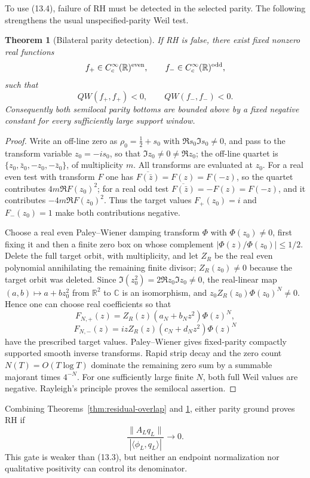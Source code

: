 \documentclass[11pt]{amsart}
\newtheorem{theorem}{Theorem}[section]
\theoremstyle{definition}
\theoremstyle{remark}
\newcommand{\R}{\mathbb R}
\begin{document}
To use (13.4), failure of RH must be detected in the selected parity.  The
following strengthens the usual unspecified-parity Weil test.

\begin{theorem}[Bilateral parity detection]
\label{thm:bilateral}
If RH is false, there exist fixed nonzero real functions
\[
 f_+\in C_c^\infty(\R)^{\rm even},
 \qquad f_-\in C_c^\infty(\R)^{\rm odd},
\]
such that
\[
 QW(f_+,f_+)<0,
 \qquad QW(f_-,f_-)<0.
 \tag{13.5}
\]
Consequently both semilocal parity bottoms are bounded above by a fixed
negative constant for every sufficiently large support window.
\end{theorem}

\begin{proof}
Write an off-line zero as \(\rho_0=\tfrac12+s_0\) with
\(\Re s_0\Im s_0\ne0\), and pass to the transform variable
\(z_0=-is_0\), so that \(\Im z_0\ne0\ne\Re z_0\); the off-line quartet is
\(\{z_0,\bar z_0,-z_0,-\bar z_0\}\), of multiplicity \(m\).  All transforms
are evaluated at \(z_0\).  For a real even test with transform \(F\) one has
\(\overline{F(\bar z)}=F(z)=F(-z)\), so the quartet contributes
\(4m\Re F(z_0)^2\); for a real odd test \(\overline{F(\bar z)}=-F(z)=F(-z)\),
and it contributes \(-4m\Re F(z_0)^2\).  Thus the target values
\(F_+(z_0)=i\) and \(F_-(z_0)=1\) make both contributions negative.

Choose a real even Paley--Wiener damping transform \(\Phi\) with
\(\Phi(z_0)\ne0\), first fixing it and then a finite zero box on whose
complement \(|\Phi(z)/\Phi(z_0)|\le1/2\).  Delete the full target orbit, with
multiplicity, and let \(Z_R\) be the real even polynomial annihilating the
remaining finite divisor; \(Z_R(z_0)\ne0\) because the target orbit was
deleted.  Since \(\Im(z_0^2)=2\Re z_0\Im z_0\ne0\), the real-linear map
\((a,b)\mapsto a+bz_0^2\) from \(\R^2\) to \(\mathbb C\) is an
isomorphism, and \(z_0Z_R(z_0)\Phi(z_0)^N\ne0\).  Hence one can choose real
coefficients so that
\[
 F_{N,+}(z)=Z_R(z)(a_N+b_Nz^2)\Phi(z)^N,
\]
\[
 F_{N,-}(z)=izZ_R(z)(c_N+d_Nz^2)\Phi(z)^N
\]
have the prescribed target values.  Paley--Wiener gives fixed-parity
compactly supported smooth inverse transforms.  Rapid strip decay and
the zero count \(N(T)=O(T\log T)\) dominate the remaining zero sum by a
summable majorant times \(4^{-N}\).  For one sufficiently large finite
\(N\), both full Weil values are negative.  Rayleigh's principle proves
the semilocal assertion.
\end{proof}

Combining Theorems~\ref{thm:residual-overlap} and
\ref{thm:bilateral}, either parity ground proves RH if
\[
 \boxed{
 \frac{\|A_Lq_L\|}{|\langle\phi_L,q_L\rangle|}\longrightarrow0.}
 \tag{13.6}
\]
This gate is weaker than (13.3), but neither an endpoint normalization nor
qualitative positivity can control its denominator.
\end{document}
